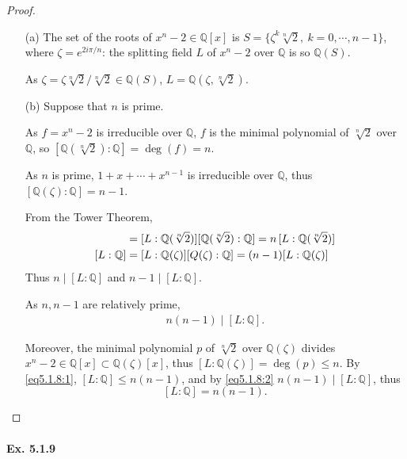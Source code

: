 \documentclass[11pt,a4paper]{article}
\newcommand{\Q}{\mathbb{Q}}
\begin{document}
\begin{proof}
\begin{enumerate}
\item[(a)]
The set of the roots of $x^n-2 \in \Q[x]$ is $S = \{\zeta^k \sqrt[n]{2},\  k = 0,\cdots,n-1\}$, where $\zeta = e^{2i\pi/n}$: the splitting field $L$ of $x^n-2$ over $\Q$ is so $\Q(S)$.

As $\zeta = \zeta \sqrt[n]{2}/\sqrt[n]{2} \in \Q(S)$, $L = \Q(\zeta, \sqrt[n]{2})$.

\item[(b)]
Suppose that $n$ is prime.

As $f=x^n-2$ is irreducible over $\Q$, $f$ is the minimal polynomial of $\sqrt[n]{2}$ over $\Q$, so $[\Q(\sqrt[n]{2}) : \Q] = \deg(f)=n$.

As $n$ is prime, $1+x+\cdots+x^{n-1}$ is irreducible over $\Q$, thus $[\Q(\zeta):\Q] = n-1$.
\begin{center}
\end{center}
From the Tower Theorem,
\begin{align}
[L : \Q] &= [L : \Q(\sqrt[n]{2})] [\Q(\sqrt[n]{2} ): \Q] = n\,  [L : \Q(\sqrt[n]{2})]   \notag\\
[L : \Q] &=[L:\Q(\zeta)][Q(\zeta):\Q] = (n-1) [L:\Q(\zeta)] \label{eq5.1.8:1}
\end{align}
Thus $n \mid [L : \Q]$ and $n-1 \mid [L : \Q] $.

As $n,n-1$ are relatively prime, 
\begin{align}
n(n-1) \mid [L : \Q].\label{eq5.1.8:2}
\end{align}

Moreover, the minimal polynomial $p$ of $\sqrt[n]{2}$ over  $\Q(\zeta)$ divides $x^n-2 \in \Q[x] \subset \Q(\zeta)[x]$, thus $[L:\Q(\zeta)] = \deg(p) \leq n$. By \eqref{eq5.1.8:1}, $[L:\Q] \leq n(n-1)$, and by \eqref{eq5.1.8:2} $n(n-1) \mid [L:\Q]$, thus
$$[L:\Q] = n(n-1).$$
\end{enumerate}
\end{proof}

\paragraph{Ex. 5.1.9}
\end{document}
